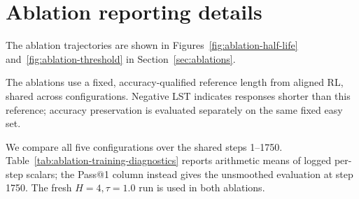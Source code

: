 \section{Ablation reporting details}
\label{app:ablations}

The ablation trajectories are shown in Figures~\ref{fig:ablation-half-life} and~\ref{fig:ablation-threshold} in Section~\ref{sec:ablations}.

The ablations use a fixed, accuracy-qualified reference length from aligned RL, shared across configurations. Negative LST indicates responses shorter than this reference; accuracy preservation is evaluated separately on the same fixed easy set.

\begin{table}[htbp]
  \centering
  \caption{\textbf{Ablation endpoint summary at step 1750.}
  Avg.\ Pass@1 is weighted over all 143 evaluation prompts.
  LST is computed against the fixed aligned-RL accuracy-qualified reference.
  The $H=4,\tau=1.0$ run is shared by both comparisons.}
  \label{tab:ablation-endpoints}
  \small
\end{table}

We compare all five configurations over the shared steps 1--1750.
Table~\ref{tab:ablation-training-diagnostics} reports arithmetic means
of logged per-step scalars; the Pass@1 column instead gives the
unsmoothed evaluation at step 1750. The fresh $H=4,\tau=1.0$ run is
used in both ablations.

